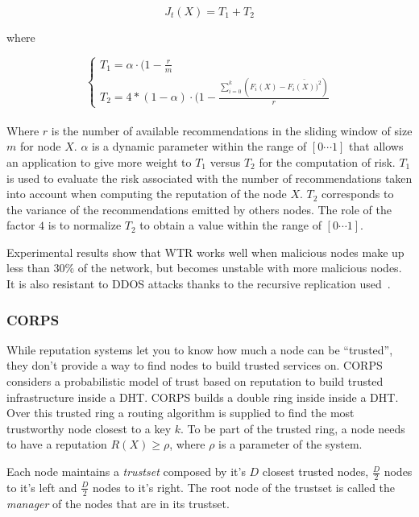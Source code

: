 \begin{equation}
  J_t(X) =  T_1 + T_2
\end{equation}

where

\begin{equation}
  \left\{
  \begin{array}{l}
    T_1 = \alpha \cdot (1-\frac{r}{m}\\
    T_2 = 4 * (1- \alpha) \cdot (1-\frac{\sum_{i=0}^{k} (F_i(X)-\bar{F_i(X))^2})}{r}
  \end{array}\right.
\end{equation}\\

Where $r$ is the number of available recommendations in the sliding window of
size $m$ for node $X$. $\alpha$ is a dynamic parameter within the range of
$[0\cdots 1]$ that allows an application to give more weight to $T_1$ versus
$T_2$ for the computation of risk. $T_1$ is used to evaluate the risk
associated with the number of recommendations taken into account when computing the
reputation of the node $X$. $T_2$ corresponds to the variance of the
recommendations emitted by others nodes. The role of the factor $4$ is to
normalize $T_2$ to obtain a value within the range of $[0\cdots 1]$.

Experimental results show that WTR works well when malicious nodes make up less
than $30\%$ of the network, but becomes unstable with more malicious nodes.
It is also resistant to DDOS attacks
thanks to the recursive replication used~\cite{recursive_replication}.

\subsubsection{CORPS}
\label{sec:corps}
While reputation systems let you to know how much a node can be
``trusted'', they don't provide a way to find nodes to build trusted services
on. CORPS~\cite{rosas2011corps} considers a probabilistic model of trust based on
reputation to build trusted infrastructure inside a DHT. CORPS builds a double
ring inside inside a DHT. Over this trusted ring a routing algorithm is supplied to
find the most trustworthy node closest to a key $k$.
To be part of the trusted ring, a node needs to have a reputation $R(X) \ge
\rho$, where $\rho$ is a parameter of the system. 

Each node maintains a \textit{trustset} composed by it's $D$ closest trusted
nodes, $\frac{D}{2}$ nodes to it's left and $\frac{D}{2}$ nodes to it's right.
The root node of the trustset is called the \textit{manager} of the nodes that are
in its trustset.

